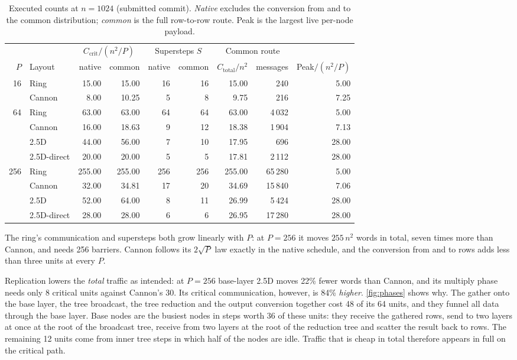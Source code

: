 \documentclass[11pt,a4paper]{article}
\newcommand{\Ccrit}{C_{\mathrm{crit}}}
\newcommand{\Ctot}{C_{\mathrm{total}}}
\begin{document}
\begin{table}[t]
\centering
\caption{Executed counts at $n=1024$ (submitted commit). \emph{Native} excludes the conversion from and to
the common distribution; \emph{common} is the full row-to-row route. Peak is the largest live per-node
payload.}
\label{tab:counts}
\small
\begin{tabular}{@{}rl rr rr rr r@{}}
\toprule
& & \multicolumn{2}{c}{$\Ccrit/(n^2/P)$} & \multicolumn{2}{c}{Supersteps $S$} & \multicolumn{2}{c}{Common route} & \\
\cmidrule(lr){3-4}\cmidrule(lr){5-6}\cmidrule(lr){7-8}
$P$ & Layout & native & common & native & common & $\Ctot/n^2$ & messages & Peak$/(n^2/P)$ \\
\midrule
16  & Ring        & 15.00 & 15.00 & 16 & 16 & 15.00 & 240 & 5.00 \\
    & Cannon      & 8.00  & 10.25 & 5  & 8  & 9.75  & 216 & 7.25 \\
\rowcolor{rowgray}
64  & Ring        & 63.00 & 63.00 & 64 & 64 & 63.00 & 4\,032 & 5.00 \\
\rowcolor{rowgray}
    & Cannon      & 16.00 & 18.63 & 9  & 12 & 18.38 & 1\,904 & 7.13 \\
\rowcolor{rowgray}
    & 2.5D        & 44.00 & 56.00 & 7  & 10 & 17.95 & 696 & 28.00 \\
\rowcolor{rowgray}
    & 2.5D-direct & 20.00 & 20.00 & 5  & 5  & 17.81 & 2\,112 & 28.00 \\
256 & Ring        & 255.00 & 255.00 & 256 & 256 & 255.00 & 65\,280 & 5.00 \\
    & Cannon      & 32.00 & 34.81 & 17 & 20 & 34.69 & 15\,840 & 7.06 \\
    & 2.5D        & 52.00 & 64.00 & 8  & 11 & 26.99 & 5\,424 & 28.00 \\
    & 2.5D-direct & 28.00 & 28.00 & 6  & 6  & 26.95 & 17\,280 & 28.00 \\
\bottomrule
\end{tabular}
\end{table}

The ring's communication and supersteps both grow linearly with $P$: at $P=256$ it moves $255\,n^2$ words
in total, seven times more than Cannon, and needs 256 barriers. Cannon follows its $2\sqrt P$ law exactly
in the native schedule, and the conversion from and to rows adds less than three units at every $P$.

Replication lowers the \emph{total} traffic as intended: at $P=256$ base-layer 2.5D moves 22\% fewer words
than Cannon, and its multiply phase needs only 8 critical units against Cannon's 30. Its critical
communication, however, is 84\% \emph{higher}. \cref{fig:phases} shows why. The gather onto the base layer,
the tree broadcast, the tree reduction and the output conversion together cost 48 of its 64 units, and
they funnel all data through the base layer. Base nodes are the busiest nodes in steps worth 36 of these
units: they receive the gathered rows, send to two layers at once at the root of the broadcast tree,
receive from two layers at the root of the reduction tree and scatter the result back to rows. The
remaining 12 units come from inner tree steps in which half of the nodes are idle. Traffic that is cheap in total therefore
appears in full on the critical path.
\end{document}
